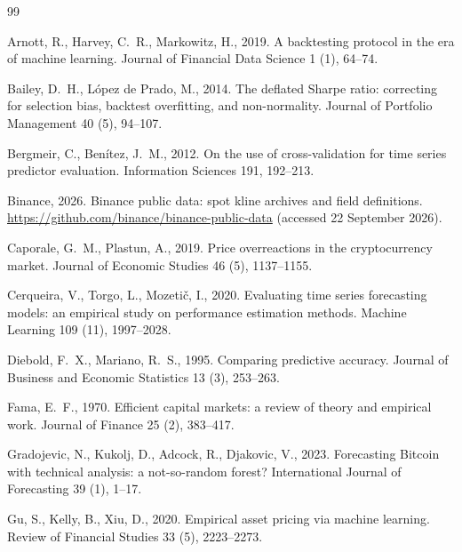 \documentclass[preprint,12pt,authoryear,a4paper]{elsarticle}
\begin{document}
\begin{thebibliography}{99}

Arnott, R., Harvey, C.~R., Markowitz, H., 2019.
A backtesting protocol in the era of machine learning.
Journal of Financial Data Science 1 (1), 64--74.

Bailey, D.~H., L\'opez de Prado, M., 2014.
The deflated Sharpe ratio: correcting for selection bias, backtest overfitting,
and non-normality.
Journal of Portfolio Management 40 (5), 94--107.

Bergmeir, C., Ben\'itez, J.~M., 2012.
On the use of cross-validation for time series predictor evaluation.
Information Sciences 191, 192--213.

Binance, 2026.
Binance public data: spot kline archives and field definitions.
\url{https://github.com/binance/binance-public-data} (accessed 22 September 2026).

Caporale, G.~M., Plastun, A., 2019.
Price overreactions in the cryptocurrency market.
Journal of Economic Studies 46 (5), 1137--1155.

Cerqueira, V., Torgo, L., Mozeti\v{c}, I., 2020.
Evaluating time series forecasting models: an empirical study on performance
estimation methods.
Machine Learning 109 (11), 1997--2028.

Diebold, F.~X., Mariano, R.~S., 1995.
Comparing predictive accuracy.
Journal of Business and Economic Statistics 13 (3), 253--263.

Fama, E.~F., 1970.
Efficient capital markets: a review of theory and empirical work.
Journal of Finance 25 (2), 383--417.

Gradojevic, N., Kukolj, D., Adcock, R., Djakovic, V., 2023.
Forecasting Bitcoin with technical analysis: a not-so-random forest?
International Journal of Forecasting 39 (1), 1--17.

Gu, S., Kelly, B., Xiu, D., 2020.
Empirical asset pricing via machine learning.
Review of Financial Studies 33 (5), 2223--2273.


\end{thebibliography}
\end{document}
